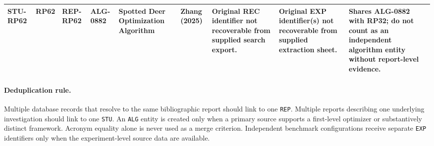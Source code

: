 \documentclass[9pt]{article}
\begin{document}
\begin{landscape}
\begin{longtable}{P{1.5cm}P{1.0cm}P{1.8cm}P{1.8cm}P{5.2cm}P{4.3cm}P{3.4cm}P{3.3cm}P{3.0cm}}
STU-RP62 & RP62 & REP-RP62 & ALG-0882 & Spotted Deer Optimization Algorithm & Zhang (2025) & Original REC identifier not recoverable from supplied search export. & Original EXP identifier(s) not recoverable from supplied extraction sheet. & Shares ALG-0882 with RP32; do not count as an independent algorithm entity without report-level evidence. \\
\bottomrule\end{longtable}\end{landscape}

\paragraph{Deduplication rule.}
Multiple database records that resolve to the same bibliographic report should link to one \texttt{REP}. Multiple reports describing one underlying investigation should link to one \texttt{STU}. An \texttt{ALG} entity is created only when a primary source supports a first-level optimizer or substantively distinct framework. Acronym equality alone is never used as a merge criterion. Independent benchmark configurations receive separate \texttt{EXP} identifiers only when the experiment-level source data are available.
\end{document}
